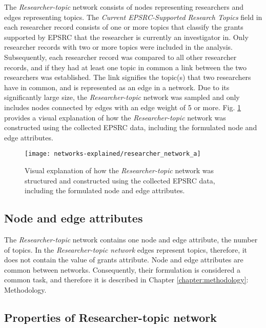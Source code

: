 The \textit{Researcher-topic} network consists of nodes representing researchers and edges representing topics. The \textit{Current EPSRC-Supported Research Topics} field in each researcher record consists of one or more topics that classify the grants supported by EPSRC that the researcher is currently an investigator in. Only researcher records with two or more topics were included in the analysis. Subsequently, each researcher record was compared to all other researcher records, and if they had at least one topic in common a link between the two researchers was established. The link signifies the topic(s) that two researchers have in common, and is represented as an edge in a network. Due to its significantly large size, the \textit{Researcher-topic} network was sampled and only includes nodes connected by edges with an edge weight of 5 or more. Fig. \ref{figure:researcher_a_structure} provides a visual explanation of how the \textit{Researcher-topic} network was constructed using the collected EPSRC data, including the formulated node and edge attributes.

\begin{figure}[htpb]
    \centering
    \texttt{[image: networks-explained/researcher\_network\_a]}
    \caption[Visual explanation of how the \textit{Researcher-topic} network was structured and constructed using the collected EPSRC data]{Visual explanation of how the \textit{Researcher-topic} network was structured and constructed using the collected EPSRC data, including the formulated node and edge attributes.}
    \label{figure:researcher_a_structure}
\end{figure}

\subsection{Node and edge attributes}

The \textit{Researcher-topic} network contains one node and edge attribute, the number of topics. In the \textit{Researcher-topic network} edges represent topics, therefore, it does not contain the value of grants attribute. Node and edge attributes are common between networks. Consequently, their formulation is considered a common task, and therefore it is described in Chapter \ref{chapter:methodology}: Methodology.

\subsection{Properties of Researcher-topic network}


